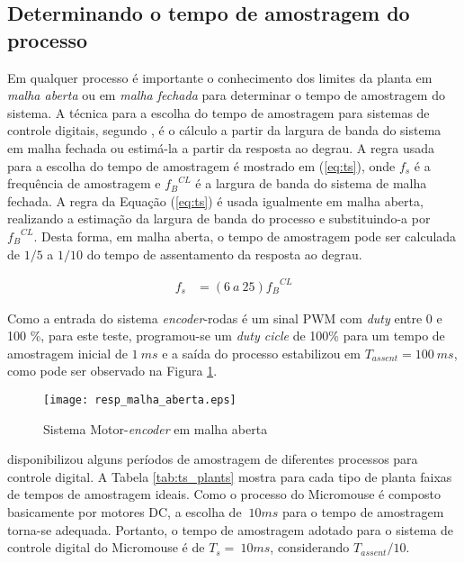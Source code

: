 	\subsection{Determinando o tempo de amostragem do processo}
	Em qualquer processo é importante o conhecimento dos limites da planta em \emph{malha aberta} ou em \emph{malha fechada} para determinar o tempo de amostragem do sistema. A técnica para a escolha do tempo de amostragem para sistemas de controle digitais, segundo , é o cálculo a partir da largura de banda do sistema em malha fechada ou estimá-la a partir da resposta ao degrau. A regra usada para a escolha do tempo de amostragem é mostrado em (\ref{eq:ts}), onde $f_s$ é a frequência de amostragem e ${f_B}^{CL}$ é a largura de banda do sistema de malha fechada. A regra da Equação (\ref{eq:ts}) é usada igualmente em malha aberta, realizando a estimação da largura de banda do processo e substituindo-a por ${f_B}^{CL}$. Desta forma, em malha aberta, o tempo de amostragem pode ser calculada de $1/5$ a $1/10$ do tempo de assentamento da resposta ao degrau.

\begin{equation}
	\label{eq:ts}
	\begin{split}
	f_s 	&=	(6~a~25){f_B}^{CL}
	\end{split}
\end{equation}	

Como a entrada do sistema \textit{encoder}-rodas é um sinal PWM com \emph{duty} entre 0 e 100 \%, para este teste, programou-se um \emph{duty cicle} de 100\% para um tempo de amostragem inicial de $1~ms$ e a saída do processo estabilizou em $T_{assent} = 100~ms$, como pode ser observado na Figura \ref{fig:malha_aberta_dc}.


\begin{figure}[!htb]
	\caption{\label{fig:malha_aberta_dc}Sistema Motor-\textit{encoder} em malha aberta}
	\begin{center}
		\texttt{[image: resp\_malha\_aberta.eps]}
	\end{center}
\end{figure}

	
	 disponibilizou alguns períodos de amostragem de diferentes processos para controle digital. A Tabela \ref{tab:ts_plants} mostra para cada tipo de planta faixas de tempos de amostragem ideais. Como o processo do Micromouse é composto basicamente por motores DC, a escolha de $~10ms$ para o tempo de amostragem torna-se adequada. Portanto, o tempo de amostragem adotado para o sistema de controle digital do Micromouse é de $T_s = ~10ms$, considerando $T_{assent}/10$.
	

